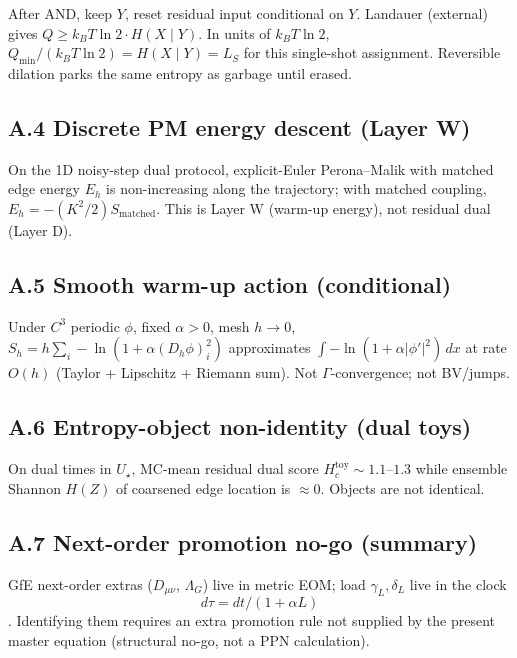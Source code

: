 \documentclass[
  11pt,
]{article}
\begin{document}
After AND, keep \(Y\), reset residual input conditional on \(Y\).
Landauer (external) gives \(Q \ge k_B T\ln 2 \cdot H(X\mid Y)\). In
units of \(k_B T\ln 2\), \(Q_{\min}/(k_B T\ln 2)=H(X\mid Y)=L_S\) for
this single-shot assignment. Reversible dilation parks the same entropy
as garbage until erased.

\subsection{A.4 Discrete PM energy descent (Layer
W)}\label{a.4-discrete-pm-energy-descent-layer-w}

On the 1D noisy-step dual protocol, explicit-Euler Perona--Malik with
matched edge energy \(E_h\) is non-increasing along the trajectory; with
matched coupling, \(E_h=-(K^2/2)S_{\mathrm{matched}}\). This is Layer W
(warm-up energy), not residual dual (Layer D).

\subsection{A.5 Smooth warm-up action
(conditional)}\label{a.5-smooth-warm-up-action-conditional}

Under \(C^3\) periodic \(\phi\), fixed \(\alpha>0\), mesh \(h\to 0\),
\(S_h=h\sum_i -\ln(1+\alpha(D_h\phi)_i^2)\) approximates
\(\int -\ln(1+\alpha|\phi'|^2)\,dx\) at rate \(O(h)\) (Taylor +
Lipschitz + Riemann sum). Not \(\Gamma\)-convergence; not BV/jumps.

\subsection{A.6 Entropy-object non-identity (dual
toys)}\label{a.6-entropy-object-non-identity-dual-toys}

On dual times in \(U_\star\), MC-mean residual dual score
\(H_c^{\mathrm{toy}}\sim 1.1\)--\(1.3\) while ensemble Shannon \(H(Z)\)
of coarsened edge location is \(\approx 0\). Objects are not identical.

\subsection{A.7 Next-order promotion no-go
(summary)}\label{a.7-next-order-promotion-no-go-summary}

GfE next-order extras (\(D_{\mu\nu}\), \(\Lambda_G\)) live in metric
EOM; load \(\gamma_L,\delta_L\) live in the clock
\[d\tau=dt/(1+\alpha L)\]. Identifying them requires an extra promotion
rule not supplied by the present master equation (structural no-go, not
a PPN calculation).
\end{document}
